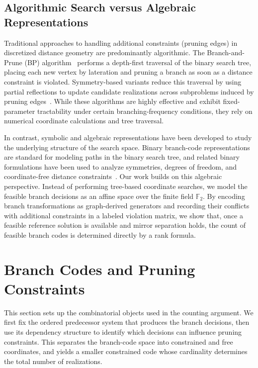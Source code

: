 \documentclass[11pt]{article}
\theoremstyle{plain}
\theoremstyle{definition}
\begin{document}
\subsection{Algorithmic Search versus Algebraic Representations}
Traditional approaches to handling additional constraints (pruning edges) in discretized distance geometry are predominantly algorithmic. The Branch-and-Prune (BP) algorithm~\cite{liberti2008branch,mucherino2012discretizable} performs a depth-first traversal of the binary search tree, placing each new vertex by lateration and pruning a branch as soon as a distance constraint is violated. Symmetry-based variants reduce this traversal by using partial reflections to update candidate realizations across subproblems induced by pruning edges~\cite{goncalves2021new}. While these algorithms are highly effective and exhibit fixed-parameter tractability under certain branching-frequency conditions, they rely on numerical coordinate calculations and tree traversal. 

In contrast, symbolic and algebraic representations have been developed to study the underlying structure of the search space. Binary branch-code representations are standard for modeling paths in the binary search tree, and related binary formulations have been used to analyze symmetries, degrees of freedom, and coordinate-free distance constraints~\cite{mucherino2012exploiting,goncalves2021new,mucherino2020analysis}. Our work builds on this algebraic perspective. Instead of performing tree-based coordinate searches, we model the feasible branch decisions as an affine space over the finite field $\mathbb{F}_2$. By encoding branch transformations as graph-derived generators and recording their conflicts with additional constraints in a labeled violation matrix, we show that, once a feasible reference solution is available and mirror separation holds, the count of feasible branch codes is determined directly by a rank formula.

\section{Branch Codes and Pruning Constraints}
\label{sec:subproblems}

This section sets up the combinatorial objects used in the counting argument. We first fix the ordered predecessor system that produces the branch decisions, then use its dependency structure to identify which decisions can influence pruning constraints. This separates the branch-code space into constrained and free coordinates, and yields a smaller constrained code whose cardinality determines the total number of realizations.
\end{document}
